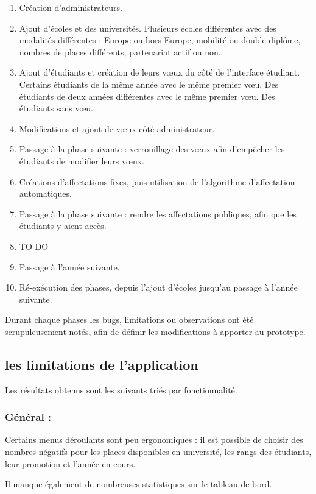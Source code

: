 \begin{enumerate}
\item Création d'administrateurs.
\item Ajout d'écoles et des universités. Plusieurs écoles différentes avec des modalités différentes : Europe ou hors Europe, mobilité ou double diplôme, nombres de places différents, partenariat actif ou non.
\item Ajout d'étudiants et création de leurs vœux du côté de l'interface étudiant. Certains étudiants de la même année avec le même premier vœu. Des étudiants de deux années différentes avec le même premier vœu. Des étudiants sans vœu.
\item Modifications et ajout de vœux côté administrateur.
\item Passage à la phase suivante : verrouillage des vœux afin d'empêcher les étudiants de modifier leurs vœux.
\item Créations d'affectations fixes, puis utilisation de l'algorithme d'affectation automatiques.
\item Passage à la phase suivante : rendre les affectations publiques, afin que les étudiants y aient accès.
\item   TO DO
\item Passage à l'année suivante.
\item Ré-exécution des phases, depuis l'ajout d'écoles jusqu'au passage à l'année suivante.
\end{enumerate}


Durant chaque phases les bugs, limitations ou observations ont été scrupuleusement notés, afin de définir les modifications à apporter au prototype.


\subsection{les limitations de l'application}

Les résultats obtenus sont les suivants triés par fonctionnalité.

\subsubsection{Général :}
Certains menus déroulants sont peu ergonomiques : il est possible de choisir des nombres négatifs pour les places disponibles en université, les rangs des étudiants, leur promotion et l'année en cours.

Il manque également de nombreuses statistiques sur le tableau de bord.

